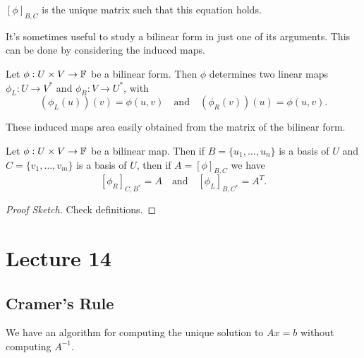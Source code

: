 \documentclass[a4paper]{scrartcl}
\begin{document}
\begin{remark}
    $[\phi]_{B, C}$ is the unique matrix such that this equation holds.
\end{remark}

It's sometimes useful to study a bilinear form in just one of its arguments. This can be done by considering the induced maps.

\begin{definition}    
    Let $\phi: U \times V \rightarrow \mathbb{F}$ be a bilinear form. Then $\phi$ determines two linear maps $\phi_L: U \rightarrow V^*$ and $\phi_R: V\rightarrow U^*$, with
    $$
    (\phi_L(u))(v) = \phi(u, v) \quad \text{and} \quad (\phi_R(v))(u) = \phi(u, v).
    $$
\end{definition}

These induced maps area easily obtained from the matrix of the bilinear form.

\begin{lemma}
    Let $\phi: U \times V \rightarrow \mathbb{F}$ be a bilinear map.
    Then if $B = \{u_1, \dots, u_n\}$ is a basis of $U$ and $C = \{v_1, \dots, v_m\}$ is a basis of $U$, then if $A = [\phi]_{B, C}$ we have
    $$
    [\phi_R]_{C, B^*} = A \quad \text{and} \quad [\phi_L]_{B, C^*} = A^T.
    $$
\end{lemma}
\begin{proof}[Proof Sketch]
    Check definitions.
\end{proof}

\section{Lecture 14}

\subsection{Cramer's Rule}

We have an algorithm for computing the unique solution to $Ax = b$ without computing $A^{-1}$.
\end{document}
